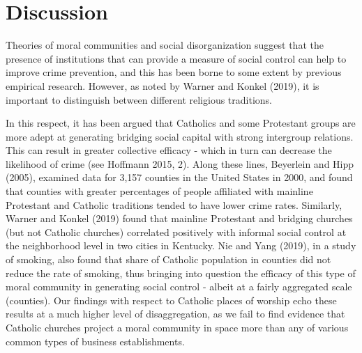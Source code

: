 \documentclass[smallextended]{svjour3}       %
\begin{document}
\hypertarget{discussion}{%
\section{Discussion}\label{discussion}}

Theories of moral communities and social disorganization suggest that
the presence of institutions that can provide a measure of social
control can help to improve crime prevention, and this has been borne to
some extent by previous empirical research. However, as noted by Warner
and Konkel (2019), it is important to distinguish between different
religious traditions.

In this respect, it has been argued that Catholics and some Protestant
groups are more adept at generating bridging social capital with strong
intergroup relations. This can result in greater collective efficacy -
which in turn can decrease the likelihood of crime (see Hoffmann 2015,
2). Along these lines, Beyerlein and Hipp (2005), examined data for
3,157 counties in the United States in 2000, and found that counties
with greater percentages of people affiliated with mainline Protestant
and Catholic traditions tended to have lower crime rates. Similarly,
Warner and Konkel (2019) found that mainline Protestant and bridging
churches (but not Catholic churches) correlated positively with informal
social control at the neighborhood level in two cities in Kentucky. Nie
and Yang (2019), in a study of smoking, also found that share of
Catholic population in counties did not reduce the rate of smoking, thus
bringing into question the efficacy of this type of moral community in
generating social control - albeit at a fairly aggregated scale
(counties). Our findings with respect to Catholic places of worship echo
these results at a much higher level of disaggregation, as we fail to
find evidence that Catholic churches project a moral community in space
more than any of various common types of business establishments.
\end{document}
